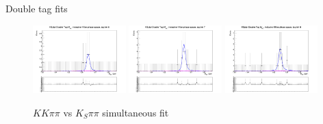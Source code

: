 \documentclass{beamer}
\begin{document}
\begin{frame}{Double tag fits}
\begin{figure}
    \includegraphics[width=0.32\textwidth, clip = true, trim = {0 11cm 0 0}]{Plots/DoubleTagYield_DoubleTag_SCMB_KKpipi_vs_KSpipi_SignalBin0_TagBin6.png}
    \includegraphics[width=0.32\textwidth, clip = true, trim = {0 11cm 0 0}]{Plots/DoubleTagYield_DoubleTag_SCMB_KKpipi_vs_KSpipi_SignalBin0_TagBin7.png}
    \includegraphics[width=0.32\textwidth, clip = true, trim = {0 11cm 0 0}]{Plots/DoubleTagYield_DoubleTag_SCMB_KKpipi_vs_KSpipi_SignalBin0_TagBin8.png}
    \caption{$KK\pi\pi$ vs $K_S\pi\pi$ simultaneous fit}
  \end{figure}
\end{frame}
\end{document}
